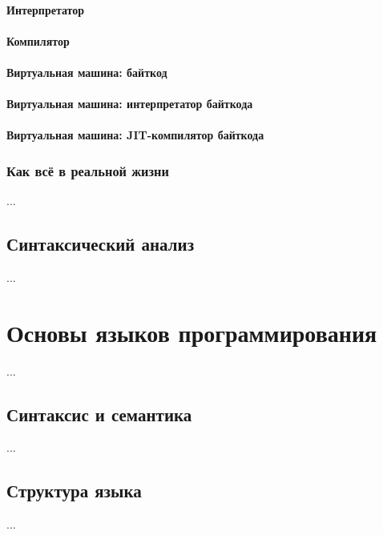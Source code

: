 \documentclass[11pt]{book}
\begin{document}


\subsubsection{Интерпретатор}


\subsubsection{Компилятор}


\subsubsection{Виртуальная машина: байткод}


\subsubsection{Виртуальная машина: интерпретатор байткода}


\subsubsection{Виртуальная машина: JIT-компилятор байткода}


\subsection{Как всё в реальной жизни}
...
\section{Синтаксический анализ}
...
\chapter{Основы языков программирования}
...
\section{Синтаксис и семантика}
...
\section{Структура языка}
...
\end{document}
